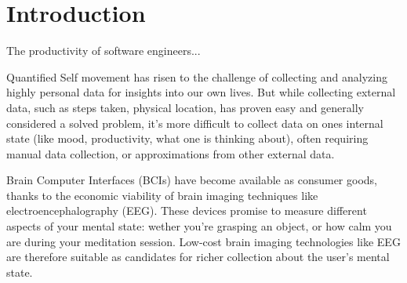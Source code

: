 \section{Introduction}



The productivity of software engineers...

Quantified Self movement has risen to the challenge of collecting and analyzing highly personal data for insights into our own lives. But while collecting external data, such as steps taken, physical location, has proven easy and generally considered a solved problem, it's more difficult to collect data on ones internal state (like mood, productivity, what one is thinking about), often requiring manual data collection, or approximations from other external data.


Brain Computer Interfaces (BCIs) have become available as consumer goods, thanks to the economic viability of brain imaging techniques like electroencephalography (EEG). These devices promise to measure different aspects of your mental state: wether you're grasping an object, or how calm you are during your meditation session. Low-cost brain imaging technologies like EEG are therefore suitable as candidates for richer collection about the user's mental state.

